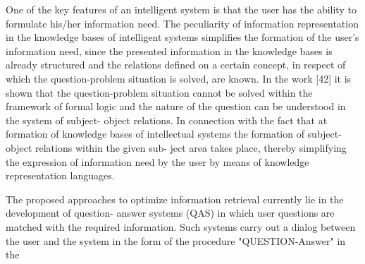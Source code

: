 \documentclass[10pt, letterpaper, twoside]{article}
\begin{document}
\begin{multicols}{2}
One of the key features of an intelligent system is that
the user has the ability to formulate his/her information
need. The peculiarity of information representation in
the knowledge bases of intelligent systems simplifies
the formation of the user’s information need, since the
presented information in the knowledge bases is already
structured and the relations defined on a certain concept,
in respect of which the question-problem situation is
solved, are known. In the work [42] it is shown that
the question-problem situation cannot be solved within
the framework of formal logic and the nature of the
question can be understood in the system of subject-
object relations. In connection with the fact that at
formation of knowledge bases of intellectual systems the
formation of subject-object relations within the given sub-
ject area takes place, thereby simplifying the expression
of information need by the user by means of knowledge
representation languages.

The proposed approaches to optimize information
retrieval currently lie in the development of question-
answer systems (QAS) in which user questions are
matched with the required information. Such systems
carry out a dialog between the user and the system in
the form of the procedure "QUESTION-Answer" in the
\end{multicols} 
 
\end{document}
